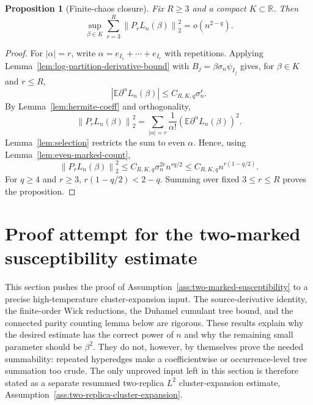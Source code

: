 \documentclass[11pt]{article}
\newtheorem{proposition}[theorem]{Proposition}
\newcommand{\E}{\mathbb{E}}
\newcommand{\R}{\mathbb{R}}
\newcommand{\norm}[1]{\left\lVert #1\right\rVert}
\begin{document}
\begin{proposition}[Finite-chaos closure]\label{prop:finite-chaos-closure}
  Fix $R\geq3$ and a compact $K\subset\R$.  Then
  \begin{equation}\label{eq:finite-chaos-closure}
    \sup_{\beta\in K}
    \sum_{r=3}^R\norm{P_rL_n(\beta)}_2^2
    =
    o(n^{2-q}).
  \end{equation}
\end{proposition}

\begin{proof}
  For $|\alpha|=r$, write $\alpha=e_{I_1}+\cdots+e_{I_r}$ with repetitions.
  Applying Lemma~\ref{lem:log-partition-derivative-bound} with
  $B_j=\beta\sigma_n\psi_{I_j}$ gives, for $\beta\in K$ and $r\leq R$,
  \begin{equation}\label{eq:fixed-alpha-bound}
    \left|\E\partial^\alpha L_n(\beta)\right|
    \leq C_{R,K,q}\sigma_n^r.
  \end{equation}
  By Lemma~\ref{lem:hermite-coeff} and orthogonality,
  \begin{equation}\label{eq:Pr-norm-coeff}
    \norm{P_rL_n(\beta)}_2^2
    =
    \sum_{|\alpha|=r}\frac1{\alpha!}
    \left(\E\partial^\alpha L_n(\beta)\right)^2.
  \end{equation}
  Lemma~\ref{lem:selection} restricts the sum to even $\alpha$.  Hence, using
  Lemma~\ref{lem:even-marked-count},
  \begin{equation}\label{eq:Pr-fixed-bound}
    \norm{P_rL_n(\beta)}_2^2
    \leq
    C_{R,K,q}\sigma_n^{2r}n^{rq/2}
    \leq
    C_{R,K,q}n^{r(1-q/2)}.
  \end{equation}
  For $q\geq4$ and $r\geq3$, $r(1-q/2)<2-q$.  Summing over fixed
  $3\leq r\leq R$ proves the proposition.
\end{proof}



\section{Proof attempt for the two-marked susceptibility estimate}
\label{sec:two-marked-proof-attempt}

This section pushes the proof of
Assumption~\ref{ass:two-marked-susceptibility} to a precise high-temperature
cluster-expansion input.  The source-derivative identity, the finite-order Wick
reductions, the Duhamel cumulant tree bound, and the connected parity counting
lemma below are rigorous.  These results explain why the desired estimate has
the correct power of $n$ and why the remaining small parameter should be
$\beta^2$.  They do not, however, by themselves prove the needed summability:
repeated hyperedges make a coefficientwise or occurrence-level tree summation
too crude.  The only unproved input left in this section is therefore stated as
a separate resummed two-replica $L^2$ cluster-expansion estimate,
Assumption~\ref{ass:two-replica-cluster-expansion}.
\end{document}
